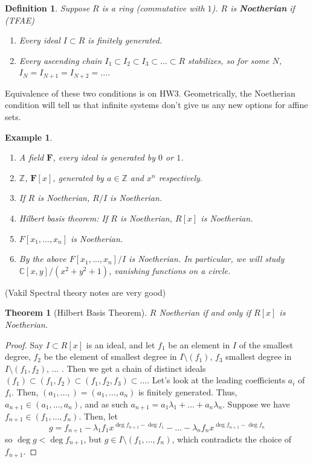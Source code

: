 \documentclass[12pt]{article}
\newcommand{\F}{\mathbf{F}}
\newcommand{\C}{\mathbb{C}}
\newcommand{\Z}{\mathbb{Z}}
\newtheorem{definition}{Definition}
\newtheorem{example}[]{Example}
\newtheorem{theorem}{Theorem}
\begin{document}
    \begin{definition}
        Suppose $R$ is a ring (commutative with $1$). $R$ is \textbf{Noetherian} if (TFAE)
        \begin{enumerate}
            \item Every ideal $I \subset R$ is finitely generated. 
            \item Every ascending chain $I_1 \subset I_2 \subset I_3 \subset \dots \subset R$ stabilizes, so for some $N$, $I_{N} = I_{N+1} = I_{N+2} = \dots$. 
        \end{enumerate} 
    \end{definition}
    Equivalence of these two conditions is on HW3. Geometrically, the Noetherian condition will tell us that infinite systems don't give us any new options for affine sets. \par 
    \begin{example}
        \begin{enumerate}
            \item A field $\F$, every ideal is generated by $0$ or $1$. 
            \item $\Z$, $\F[x]$, generated by $a \in \Z$ and $x^n$ respectively. 
            \item If $R$ is Noetherian, $R/I$ is Noetherian. 
            \item Hilbert basis theorem: If $R$ is Noetherian, $R[x]$ is Noetherian. 
            \item $F[x_1, \dots, x_n]$ is Noetherian. 
            \item By the above $F[x_1, \dots, x_n]/I$ is Noetherian. In particular, we will study $\C[x, y]/(x^2 + y^2 + 1)$, vanishing functions on a circle. 
        \end{enumerate}
    \end{example}
    (Vakil Spectral theory notes are very good)\par 
    \begin{theorem}
        [Hilbert Basis Theorem] $R$ Noetherian if and only if $R[x]$ is Noetherian. 
    \end{theorem}
    \begin{proof}
        Say $I \subset R[x]$ is an ideal, and let $f_1$ be an element in $I$ of the smallest degree, $f_2$ be the element of smallest degree in $I \setminus (f_1)$, $f_3$ smallest degree in $I \setminus (f_1, f_2)$, ... . Then we get a chain of distinct ideals $(f_1) \subset (f_1, f_2) \subset (f_1, f_2, f_3) \subset \dots$. Let's look at the leading coefficients $a_i$ of $f_i$. Then, $(a_1, \dots, ) = (a_1, \dots, a_n)$ is finitely generated. Thus, $a_{n+1} \in (a_1, \dots, a_n)$, and as such $a_{n+1} = a_1\lambda_1 + \dots + a_n\lambda_n$. Suppose we have $f_{n+1} \in (f_1, \dots, f_n)$. Then, let 
        $$g = f_{n+1} - \lambda_1 f_1 x^{\deg f_{n+1} - \deg f_1} - \dots - \lambda_n f_n x^{\deg f_{n+1} - \deg f_n}$$
        so $\deg g < \deg f_{n+1}$, but $g \in I \setminus (f_1, \dots, f_n)$, which contradicts the choice of $f_{n+1}$. 
    \end{proof}
\end{document}
